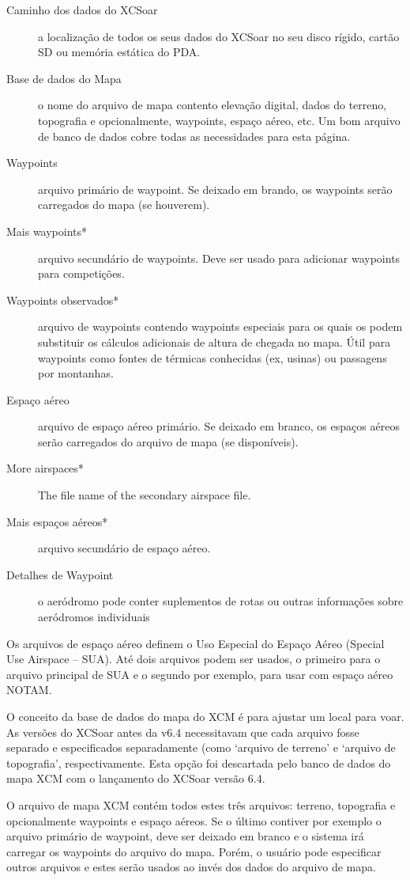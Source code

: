 \begin{description}
\item[Caminho dos dados do XCSoar]  a localização de todos os seus dados do XCSoar no seu disco rígido, cartão SD ou memória estática do PDA.
\item[Base de dados do Mapa]  o nome do arquivo de mapa contento elevação digital, dados do terreno, topografia e opcionalmente, waypoints, espaço aéreo, etc.  Um bom arquivo de banco de dados cobre todas as necessidades para esta página.
\item[Waypoints]  arquivo primário de waypoint.  Se deixado em brando, os waypoints serão carregados do mapa (se houverem).
\item[Mais waypoints*]  arquivo secundário de waypoints.  Deve ser usado para adicionar waypoints para competições.
\item[Waypoints observados*]  arquivo de waypoints contendo waypoints especiais para os quais os podem substituir os cálculos adicionais de altura de chegada no mapa.  Útil para waypoints como fontes de térmicas conhecidas (ex, usinas) ou passagens por montanhas.
\item[Espaço aéreo]  arquivo de espaço aéreo primário.  Se deixado em branco, os espaços aéreos serão carregados do arquivo de mapa (se disponíveis).
\item[More airspaces*]  The file name of the secondary airspace file.
\item[Mais espaços aéreos*] arquivo secundário de espaço aéreo.
\item[Detalhes de Waypoint] o aeródromo pode conter suplementos de rotas ou outras informações sobre aeródromos individuais
\end{description}

Os arquivos de espaço aéreo definem o Uso Especial do Espaço Aéreo (Special Use Airspace – SUA).  Até dois arquivos podem ser usados, o primeiro para o arquivo principal de SUA e o segundo por exemplo, para usar com espaço aéreo NOTAM.

O conceito da base de dados do mapa do XCM é para ajustar um local para voar.  As versões do XCSoar antes da v6.4 necessitavam que cada arquivo fosse separado e especificados separadamente (como ‘arquivo de terreno’ e ‘arquivo de topografia’, respectivamente.  Esta opção foi descartada pelo banco de dados do mapa XCM com o lançamento do XCSoar versão 6.4.

O arquivo de mapa XCM contém todos estes três arquivos: terreno, topografia e opcionalmente waypoints e espaço aéreos.  Se o último contiver por exemplo o arquivo primário de waypoint, deve ser deixado em branco e o sistema irá carregar os waypoints do arquivo do mapa.  Porém, o usuário pode especificar outros arquivos e estes serão usados ao invés dos dados do arquivo de mapa.

